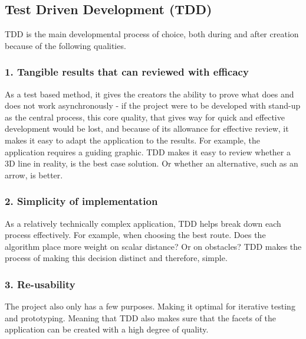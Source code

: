
\subsection*{Test Driven Development (TDD)}

TDD is the main developmental process of choice, both during and after creation because of the following qualities. 

\subsubsection{1. Tangible results that can reviewed with efficacy}
As a test based method, it gives the creators the ability to prove what does and does not work asynchronously - if the project were to be developed with stand-up as the central process, this core quality, that gives way for quick and effective development would be lost, and because of its allowance for effective review, it makes it easy to adapt the application to the results. For example, the application requires a guiding graphic. TDD makes it easy to review whether a 3D line in reality, is the best case solution. Or whether an alternative, such as an arrow, is better.

\subsubsection{2. Simplicity of implementation}
As a relatively technically complex application, TDD helps break down each process effectively. For example, when choosing the best route. Does the algorithm place more weight on scalar distance? Or on obstacles? TDD makes the process of making this decision distinct and therefore, simple.

\subsubsection{3. Re-usability}
The project also only has a few purposes. Making it optimal for iterative testing and prototyping. Meaning that TDD also makes sure that the facets of the application can be created with a high degree of quality.